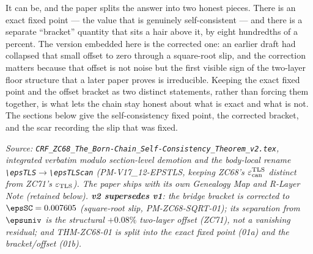 \documentclass[12pt, a4paper]{article}
\begin{document}
It can be, and the paper splits the answer into two honest pieces. There is an
exact fixed point --- the value that is genuinely self-consistent --- and there
is a separate ``bracket'' quantity that sits a hair above it, by eight
hundredths of a percent. The version embedded here is the corrected one: an
earlier draft had collapsed that small offset to zero through a square-root
slip, and the correction matters because that offset is not noise but the first
visible sign of the two-layer floor structure that a later paper proves is
irreducible. Keeping the exact fixed point and the offset bracket as two
distinct statements, rather than forcing them together, is what lets the chain
stay honest about what is exact and what is not. The sections below give the
self-consistency fixed point, the corrected bracket, and the scar recording the
slip that was fixed.
\label{sec:zc68}

\noindent
\textit{Source: \texttt{CRF\_ZC68\_The\_Born-Chain\_Self-Consistency\_Theorem\_v2.tex},
integrated verbatim modulo section-level demotion and the body-local rename
\texttt{\textbackslash epsTLS}$\to$\texttt{\textbackslash epsTLScan}
(PM-V17\_12-EPSTLS, keeping ZC68's $\varepsilon_{\rm can}^{\rm TLS}$ distinct
from ZC71's $\varepsilon_{\rm TLS}$). The paper ships with its own Genealogy
Map and R-Layer Note (retained below).
\textbf{v2 supersedes v1}: the bridge bracket is corrected to
$\epsSC=0.007605$ (square-root slip, PM-ZC68-SQRT-01); its separation from
$\epsuniv$ is the structural $+0.08\%$ two-layer offset (ZC71), not a vanishing
residual; and THM-ZC68-01 is split into the exact fixed point (01a) and the
bracket/offset (01b).}

\medskip

\sloppy

\end{document}
